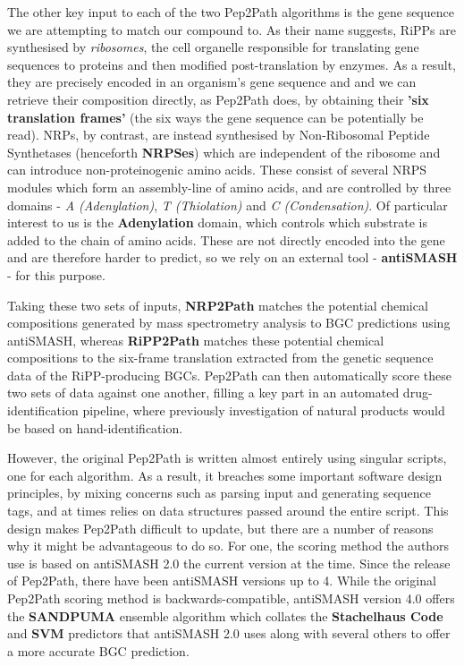 \documentclass{l4proj}
\newcommand{\cit}[1]{\citep{#1}}
\begin{document}
The other key input to each of the two Pep2Path algorithms is the gene sequence we are attempting to match our compound to. As their name suggests, RiPPs are synthesised by \textit{ribosomes}, the cell organelle responsible for translating gene sequences to proteins and then modified post-translation by enzymes. As a result, they are precisely encoded in an organism's gene sequence and and we can retrieve their composition directly, as Pep2Path does, by obtaining their \textbf{'six translation frames'} (the six ways the gene sequence can be potentially be read). NRPs, by contrast, are instead synthesised by Non-Ribosomal Peptide Synthetases (henceforth \textbf{NRPSes}) which are independent of the ribosome and can introduce non-proteinogenic amino acids. These consist of several NRPS modules which form an assembly-line of amino acids, and are controlled by three domains - \textit{A (Adenylation)}, \textit{T (Thiolation)} and \textit{C (Condensation)}. Of particular interest to us is the \textbf{Adenylation} domain, which controls which substrate is added to the chain of amino acids. These are not directly encoded into the gene and are therefore harder to predict, so we rely on an external tool - \textbf{antiSMASH} \cit{as4} - for this purpose.

Taking these two sets of inputs, \textbf{NRP2Path} matches the potential chemical compositions generated by mass spectrometry analysis to BGC predictions using antiSMASH, whereas \textbf{RiPP2Path} matches these potential chemical compositions to the six-frame translation extracted from the genetic sequence data of the RiPP-producing BGCs. Pep2Path can then automatically score these two sets of data against one another, filling a key part in an automated drug-identification pipeline, where previously investigation of natural products would be based on hand-identification.

However, the original Pep2Path is written almost entirely using singular scripts, one for each algorithm. As a result, it breaches some important software design principles, by mixing concerns such as parsing input and generating sequence tags, and at times relies on data structures passed around the entire script. This design makes Pep2Path difficult to update, but there are a number of reasons why it might be advantageous to do so. For one, the scoring method the authors use is based on antiSMASH 2.0 \cit{as2} the current version at the time. Since the release of Pep2Path, there have been antiSMASH versions up to 4. \cit{as4} While the original Pep2Path scoring method is backwards-compatible, antiSMASH version 4.0 offers the \textbf{SANDPUMA} ensemble algorithm \cit{sandpuma} which collates the \textbf{Stachelhaus Code} and \textbf{SVM} predictors that antiSMASH 2.0 uses along with several others to offer a more accurate BGC prediction.
\end{document}
